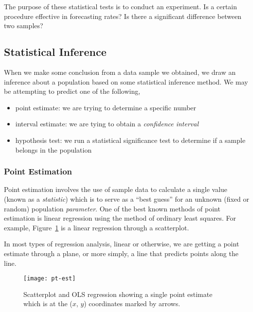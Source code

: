 The purpose of these statistical tests is to conduct an experiment. Is a certain procedure effective in forecasting rates? Is there a significant difference between two samples?

\subsection{Statistical Inference}
When we make some conclusion from a data sample we obtained, we draw an inference about a population based on some statistical inference method. We may be attempting to predict one of the following,
\begin{itemize}
\item point estimate:  we are trying to determine a specific number
\item interval estimate: we are tying to obtain a \emph{confidence interval}
\item hypothesis test:  we run a statistical significance test to determine if a sample belongs in the population
\end{itemize}

\subsubsection{Point Estimation}
Point estimation involves the use of sample data to calculate a single value (known as a \emph{statistic}) which is to serve as a ``best guess'' for an unknown (fixed or random) population \emph{parameter}.
\marginpar{\begin{small}\begin{flushleft}\textcolor{red}{A statistic is drawn from a sample. \\ A parameter is contained in the population.}\end{flushleft}\end{small}}
One of the best known methods of point estimation is linear regression using the method of ordinary least squares. For example, Figure~\ref{figure:pt-est} is a linear regression through a scatterplot.

In most types of regression analysis, linear or otherwise, we are getting a point estimate through a plane, or more simply, a line that predicts points along the line.
\begin{figure}[t]
  \centering
  \texttt{[image: pt-est]}
  \caption[Scatterplot and OLS Regression]{Scatterplot and OLS regression showing a single point estimate which is at the ($x$, $y$) coordinates marked by arrows.}
  \label{figure:pt-est}
\end{figure}

